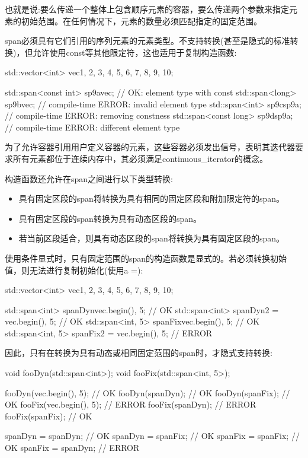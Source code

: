 也就是说:要么传递一个整体上包含顺序元素的容器，要么传递两个参数来指定元素的初始范围。在任何情况下，元素的数量必须匹配指定的固定范围。


span必须具有它们引用的序列元素的元素类型。不支持转换(甚至是隐式的标准转换)，但允许使用const等其他限定符，这也适用于复制构造函数:

\begin{cpp}
std::vector<int> vec{1, 2, 3, 4, 5, 6, 7, 8, 9, 10};

std::span<const int> sp9a{vec}; // OK: element type with const
std::span<long> sp9b{vec}; // compile-time ERROR: invalid element type
std::span<int> sp9c{sp9a}; // compile-time ERROR: removing constness
std::span<const long> sp9d{sp9a}; // compile-time ERROR: different element type
\end{cpp}

为了允许容器引用用户定义容器的元素，这些容器必须发出信号，表明其迭代器要求所有元素都位于连续内存中，其必须满足continuous\_iterator的概念。

构造函数还允许在span之间进行以下类型转换:

\begin{itemize}
\item
具有固定区段的span将转换为具有相同的固定区段和附加限定符的span。

\item
具有固定区段的span转换为具有动态区段的span。

\item
若当前区段适合，则具有动态区段的span将转换为具有固定区段的span。
\end{itemize}

使用条件显式时，只有固定范围的span的构造函数是显式的。若必须转换初始值，则无法进行复制初始化(使用a =):

\begin{cpp}
std::vector<int> vec{1, 2, 3, 4, 5, 6, 7, 8, 9, 10};

std::span<int> spanDyn{vec.begin(), 5}; // OK
std::span<int> spanDyn2 = {vec.begin(), 5}; // OK
std::span<int, 5> spanFix{vec.begin(), 5}; // OK
std::span<int, 5> spanFix2 = {vec.begin(), 5}; // ERROR
\end{cpp}

因此，只有在转换为具有动态或相同固定范围的span时，才隐式支持转换:

\begin{cpp}
void fooDyn(std::span<int>);
void fooFix(std::span<int, 5>);

fooDyn({vec.begin(), 5}); // OK
fooDyn(spanDyn); // OK
fooDyn(spanFix); // OK
fooFix({vec.begin(), 5}); // ERROR
fooFix(spanDyn); // ERROR
fooFix(spanFix); // OK

spanDyn = spanDyn; // OK
spanDyn = spanFix; // OK
spanFix = spanFix; // OK
spanFix = spanDyn; // ERROR
\end{cpp}

